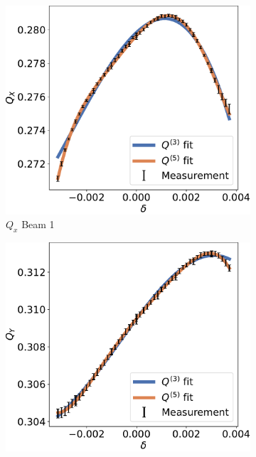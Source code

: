 \begin{figure}[!htb]
    \begin{subfigure}{0.49\textwidth}
        \centering
        \includegraphics[width=\textwidth]{./images/higher_orders/bb_corrections_chroma/Beam1_Qx.pdf}
        \caption{$Q_x$ Beam 1}
        \label{}
    \end{subfigure}
    \hfill
    \begin{subfigure}{0.49\textwidth}
        \centering
        \includegraphics[width=\textwidth]{./images/higher_orders/bb_corrections_chroma/Beam1_Qy.pdf}

\end{subfigure}
\end{figure}
